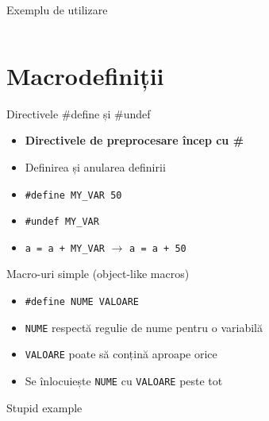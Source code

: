 \documentclass{beamer}
\begin{document}
\begin{frame}{Exemplu de utilizare}
	\begin{columns}
		\begin{column}[l]{0.5\textwidth}
			
		\end{column}
		\begin{column}[l]{0.4\textwidth}
			
		\end{column}
	\end{columns}
\end{frame}

\section{Macrodefiniții}

\frame{\tableofcontents[currentsection]}

\begin{frame}{Directivele \#define și \#undef}
	\begin{itemize}
		\item \textbf{Directivele de preprocesare încep cu \textbf{\#}}
		\item Definirea și anularea definirii
		\item \texttt{\#define MY\_VAR  50}
		\item \texttt{\#undef MY\_VAR}
		\item \texttt{a = a + MY\_VAR} $\rightarrow$ \texttt{a = a + 50}
	\end{itemize}
\end{frame}

\begin{frame}{Macro-uri simple (object-like macros)}
	\begin{itemize}
		\item \texttt{\#define NUME	VALOARE}
		\item \texttt{NUME} respectă regulie de nume pentru o variabilă
		\item \texttt{VALOARE} poate să conțină aproape orice
		\item Se înlocuiește \texttt{NUME} cu \texttt{VALOARE} peste tot
	\end{itemize}
\end{frame}

\begin{frame}{Stupid example}
	\begin{columns}
		\begin{column}[l]{0.4\textwidth}
			
		\end{column}
		\begin{column}[l]{0.4\textwidth}
			
		\end{column}
	\end{columns}
\end{frame}
\end{document}
